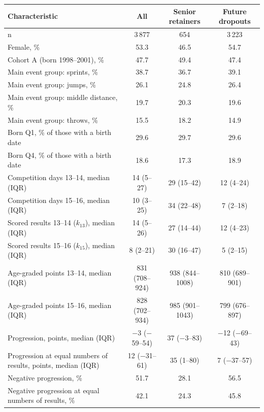 \begin{tabular}{lccc}
\toprule
Characteristic & All & Senior retainers & Future dropouts \\
\midrule
n & 3\,877 & 654 & 3\,223 \\
Female, \% & 53.3 & 46.5 & 54.7 \\
Cohort A (born 1998--2001), \% & 47.7 & 49.4 & 47.4 \\
Main event group: sprints, \% & 38.7 & 36.7 & 39.1 \\
Main event group: jumps, \% & 26.1 & 24.8 & 26.4 \\
Main event group: middle distance, \% & 19.7 & 20.3 & 19.6 \\
Main event group: throws, \% & 15.5 & 18.2 & 14.9 \\
Born Q1, \% of those with a birth date & 29.6 & 29.7 & 29.6 \\
Born Q4, \% of those with a birth date & 18.6 & 17.3 & 18.9 \\
Competition days 13--14, median (IQR) & 14 (5--27) & 29 (15--42) & 12 (4--24) \\
Competition days 15--16, median (IQR) & 10 (3--25) & 34 (22--48) & 7 (2--18) \\
Scored results 13--14 ($k_{13}$), median (IQR) & 14 (5--26) & 27 (14--44) & 12 (4--23) \\
Scored results 15--16 ($k_{15}$), median (IQR) & 8 (2--21) & 30 (16--47) & 5 (2--15) \\
Age-graded points 13--14, median (IQR) & 831 (708--924) & 938 (844--1008) & 810 (689--901) \\
Age-graded points 15--16, median (IQR) & 828 (702--934) & 985 (901--1043) & 799 (676--897) \\
Progression, points, median (IQR) & $-$3 ($-$59--54) & 37 ($-$3--83) & $-$12 ($-$69--43) \\
Progression at equal numbers of results, points, median (IQR) & 12 ($-$31--61) & 35 (1--80) & 7 ($-$37--57) \\
Negative progression, \% & 51.7 & 28.1 & 56.5 \\
Negative progression at equal numbers of results, \% & 42.1 & 24.3 & 45.8 \\
\bottomrule
\end{tabular}
